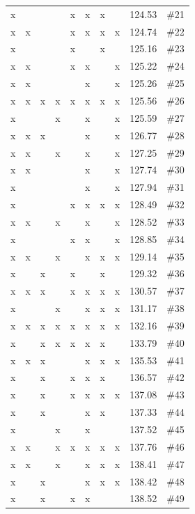 \begin{table}[H]
{\begin{tabular}{c c c c c c c c c c}
 x &  &  &  &  x &  x &  x &  & 124.53 & \#21 \\
 x &  x &  &  &  x &  x &  x &  x & 124.74 & \#22 \\
 x &  &  &  &  x &  &  x &  & 125.16 & \#23 \\
 x &  x &  &  &  x &  x &  &  x & 125.22 & \#24 \\
 x &  x &  &  &  &  x &  &  x & 125.26 & \#25 \\
 x &  x &  x &  x &  x &  x &  x &  x & 125.56 & \#26 \\
 x &  &  &  x &  &  x &  &  x & 125.59 & \#27 \\
 x &  x &  x &  &  &  x &  &  x & 126.77 & \#28 \\
 x &  x &  &  x &  &  x &  &  x & 127.25 & \#29 \\
 x &  x &  &  &  &  x &  &  x & 127.74 & \#30 \\
 x &  &  &  &  &  x &  &  x & 127.94 & \#31 \\
 x &  &  &  &  x &  x &  x &  x & 128.49 & \#32 \\
 x &  x &  &  x &  &  x &  &  x & 128.52 & \#33 \\
 x &  &  &  &  x &  x &  &  x & 128.85 & \#34 \\
 x &  x &  &  x &  &  x &  x &  x & 129.14 & \#35 \\
 x &  &  x &  &  x &  &  x &  & 129.32 & \#36 \\
 x &  x &  x &  &  x &  x &  x &  x & 130.57 & \#37 \\
 x &  &  &  x &  &  x &  x &  x & 131.17 & \#38 \\
 x &  x &  x &  x &  x &  x &  x &  x & 132.16 & \#39 \\
 x &  &  x &  x &  x &  x &  x &  & 133.79 & \#40 \\
 x &  x &  x &  &  &  x &  x &  x & 135.53 & \#41 \\
 x &  &  x &  &  x &  x &  x &  & 136.57 & \#42 \\
 x &  &  x &  &  x &  x &  x &  x & 137.08 & \#43 \\
 x &  &  x &  &  &  x &  x &  & 137.33 & \#44 \\
 x &  &  &  x &  &  x &  &  & 137.52 & \#45 \\
 x &  x &  &  x &  x &  x &  x &  x & 137.76 & \#46 \\
 x &  x &  &  x &  &  x &  x &  x & 138.41 & \#47 \\
 x &  &  x &  &  &  x &  x &  x & 138.42 & \#48 \\
 x &  &  x &  &  x &  x &  &  & 138.52 & \#49 \\

\end{tabular}}
\end{table}
